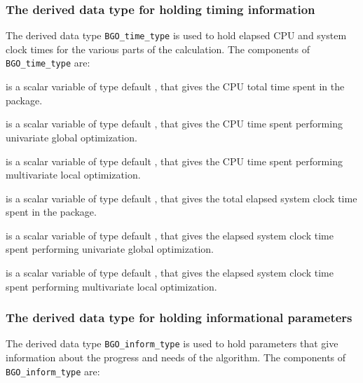 \documentclass{galahad}
\newcommand{\packagename}{BGO}
\begin{document}
\subsubsection{The derived data type for holding timing
 information}\label{typetime}
The derived data type
{\tt \packagename\_time\_type}
is used to hold elapsed CPU and system clock times for the various parts
of the calculation. The components of
{\tt \packagename\_time\_type}
are:
\begin{description}
 is a scalar variable of type default \real, that gives
 the CPU total time spent in the package.

 is a scalar variable of type default \realdp, that
gives the CPU time spent performing univariate global optimization.

 is a scalar variable of type default \realdp, that
gives the CPU time spent performing multivariate local optimization.

 is a scalar variable of type default \real, that gives
 the total elapsed system clock time spent in the package.

 is a scalar variable of type default \realdp,
that gives the elapsed system clock time spent performing univariate global
optimization.

 is a scalar variable of type default \realdp,
that gives the  elapsed system clock time spent performing multivariate local
optimization.

\end{description}


\subsubsection{The derived data type for holding informational
 parameters}\label{typeinform}
The derived data type
{\tt \packagename\_inform\_type}
is used to hold parameters that give information about the progress and needs
of the algorithm. The components of
{\tt \packagename\_inform\_type}
are:
\end{document}
